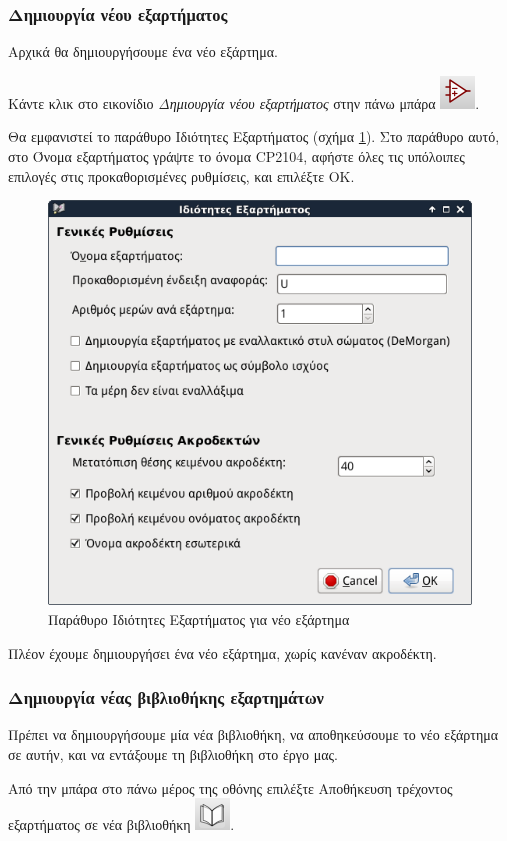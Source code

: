 \documentclass[a4paper]{article}
\begin{document}
\subsubsection{Δημιουργία νέου εξαρτήματος}

Αρχικά θα δημιουργήσουμε ένα νέο εξάρτημα.

Κάντε κλικ στο εικονίδιο \textit{Δημιουργία νέου εξαρτήματος} στην πάνω μπάρα \includegraphics[scale=.5]{img/libed-ico-newcomp.png}. 

Θα εμφανιστεί το παράθυρο Ιδιότητες Εξαρτήματος (σχήμα \ref{fig:libed-dial-newcompprop}). Στο παράθυρο αυτό, στο Όνομα εξαρτήματος γράψτε το όνομα CP2104, αφήστε όλες τις υπόλοιπες επιλογές στις προκαθορισμένες ρυθμίσεις, και επιλέξτε ΟΚ.

\begin{figure}
  \begin{center}
    \includegraphics[width=.5\textwidth]{img/libed-dial-newcompprop.png}
    \caption{Παράθυρο Ιδιότητες Εξαρτήματος για νέο εξάρτημα}
    \label{fig:libed-dial-newcompprop}
  \end{center}
\end{figure}

Πλέον έχουμε δημιουργήσει ένα νέο εξάρτημα, χωρίς κανέναν ακροδέκτη. 

\subsubsection{Δημιουργία νέας βιβλιοθήκης εξαρτημάτων}

Πρέπει να δημιουργήσουμε μία νέα βιβλιοθήκη, να αποθηκεύσουμε το νέο εξάρτημα σε αυτήν, και να εντάξουμε τη βιβλιοθήκη στο έργο μας.

Από την μπάρα στο πάνω μέρος της οθόνης επιλέξτε Αποθήκευση τρέχοντος εξαρτήματος σε νέα βιβλιοθήκη \includegraphics[scale=.5]{img/libed-ico-savnewlib.png}.
\end{document}
